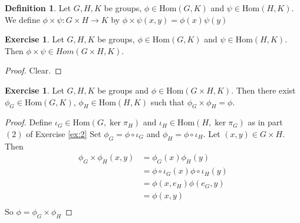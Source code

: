 \documentclass[12pt]{amsart}
\theoremstyle{definition}
\newtheorem{defn}[definition]{Definition}
\newtheorem{ex}[definition]{Exercise}
\newcommand{\Hom}{\text{Hom}}
\newcommand{\lex}[1]{\label{ex:#1}}
\newcommand{\rex}[1]{Exercise \ref{ex:#1}}
\begin{document}
	\begin{defn}
	Let $G,H, K$ be groups, $\phi \in \Hom(G,K)$ and $\psi \in \Hom(H, K)$. We define $\phi \times \psi: G \times H \rightarrow K$ by $\phi \times \psi(x,y) = \phi(x) \psi(y)$ 
	\end{defn}	
	
	\begin{ex}
	\lex{3} Let $G,H, K$ be groups, $\phi \in \Hom(G,K)$ and $\psi \in \Hom(H, K)$. Then $\phi \times \psi \in Hom(G \times H,K)$.
	\end{ex}
	
	\begin{proof}
	Clear.
	\end{proof}
	
	\begin{ex}
	\lex{4} Let $G,H, K$ be groups and $\phi \in \Hom(G \times H, K)$. Then there exist $\phi_G \in \Hom(G,K)$, $\phi_H \in \Hom(H, K)$ such that $\phi_G \times \phi_H = \phi$.
	\end{ex}
	
	\begin{proof}
	Define $\iota_G \in \Hom(G, \ker \pi_H)$ and $\iota_H \in \Hom(H, \ker \pi_G)$ as in part $(2)$ of \rex{2} Set $\phi_G = \phi \circ \iota_G$ and $\phi_H = \phi \circ \iota_H $. Let $(x,y) \in G \times H$. Then 
	\begin{align*}
	\phi_G \times \phi_H(x,y) 
	&= \phi_G(x) \phi_H(y) \\
	&= \phi \circ \iota_G(x) \phi \circ \iota_H(y) \\
	&= \phi(x, e_H)\phi(e_G, y) \\
	&= \phi(x,y) \\
	\end{align*}
	So $\phi = \phi_G \times \phi_H$
	\end{proof}
\end{document}
